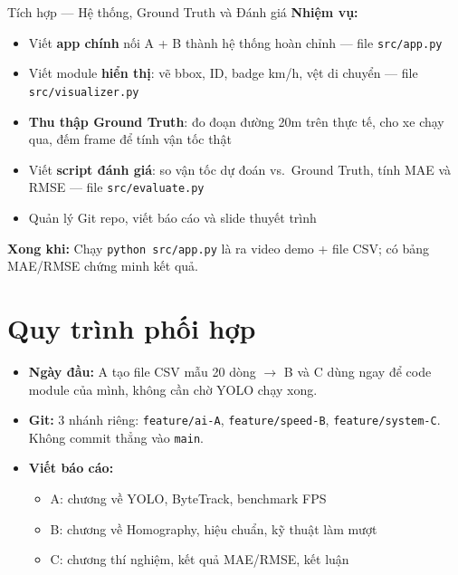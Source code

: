 \documentclass[11pt,a4paper]{article}
\begin{document}
\vspace{0.3cm}

\begin{roleboxC}{Tích hợp --- Hệ thống, Ground Truth và Đánh giá}
\textbf{Nhiệm vụ:}
\begin{itemize}
    \item Viết \textbf{app chính} nối A + B thành hệ thống hoàn chỉnh --- file \texttt{src/app.py}
    \item Viết module \textbf{hiển thị}: vẽ bbox, ID, badge km/h, vệt di chuyển --- file \texttt{src/visualizer.py}
    \item \textbf{Thu thập Ground Truth}: đo đoạn đường 20m trên thực tế, cho xe chạy qua, đếm frame để tính vận tốc thật
    \item Viết \textbf{script đánh giá}: so vận tốc dự đoán vs.\ Ground Truth, tính MAE và RMSE --- file \texttt{src/evaluate.py}
    \item Quản lý Git repo, viết báo cáo và slide thuyết trình
\end{itemize}

\textbf{Xong khi:} Chạy \texttt{python src/app.py} là ra video demo + file CSV; có bảng MAE/RMSE chứng minh kết quả.
\end{roleboxC}

\section{Quy trình phối hợp}

\begin{itemize}
    \item \textbf{Ngày đầu:} A tạo file CSV mẫu 20 dòng $\rightarrow$ B và C dùng ngay để code module của mình, không cần chờ YOLO chạy xong.
    \item \textbf{Git:} 3 nhánh riêng: \texttt{feature/ai-A}, \texttt{feature/speed-B}, \texttt{feature/system-C}. Không commit thẳng vào \texttt{main}.
    \item \textbf{Viết báo cáo:}
    \begin{itemize}
        \item A: chương về YOLO, ByteTrack, benchmark FPS
        \item B: chương về Homography, hiệu chuẩn, kỹ thuật làm mượt
        \item C: chương thí nghiệm, kết quả MAE/RMSE, kết luận
    \end{itemize}
\end{itemize}
\end{document}
